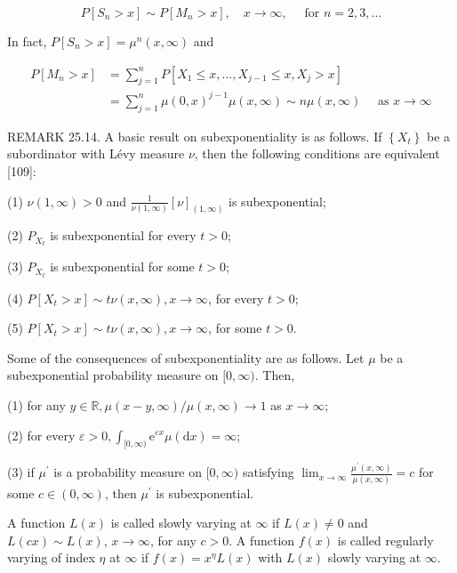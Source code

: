 \documentclass[a4paper,12pt]{article}
\begin{document}
$$
    P\left[S_{n}>x\right] \sim P\left[M_{n}>x\right], \quad x \rightarrow \infty, \quad \text { for } n=2,3, \ldots
$$

In fact, $P\left[S_{n}>x\right]=\mu^{n}(x, \infty)$ and

$$
    \begin{aligned}
        P\left[M_{n}>x\right] & =\sum_{j=1}^{n} P\left[X_{1} \leq x, \ldots, X_{j-1} \leq x, X_{j}>x\right]                                  \\
                              & =\sum_{j=1}^{n} \mu(0, x)^{j-1} \mu(x, \infty) \sim n \mu(x, \infty) \quad \text { as } x \rightarrow \infty
    \end{aligned}
$$

REMARK 25.14. A basic result on subexponentiality is as follows. If $\left\{X_{t}\right\}$ be a subordinator with Lévy measure $\nu$, then the following conditions are equivalent [109]:

(1) $\nu(1, \infty)>0$ and $\frac{1}{\nu(1, \infty)}[\nu]_{(1, \infty)}$ is subexponential;

(2) $P_{X_{t}}$ is subexponential for every $t>0$;

(3) $P_{X_{t}}$ is subexponential for some $t>0$;

(4) $P\left[X_{t}>x\right] \sim t \nu(x, \infty), x \rightarrow \infty$, for every $t>0$;

(5) $P\left[X_{t}>x\right] \sim t \nu(x, \infty), x \rightarrow \infty$, for some $t>0$.

Some of the consequences of subexponentiality are as follows. Let $\mu$ be a subexponential probability measure on $[0, \infty)$. Then,

(1) for any $y \in \mathbb{R}, \mu(x-y, \infty) / \mu(x, \infty) \rightarrow 1$ as $x \rightarrow \infty$;

(2) for every $\varepsilon>0, \int_{[0, \infty)} \mathrm{e}^{\varepsilon x} \mu(\mathrm{d} x)=\infty$;

(3) if $\mu^{\prime}$ is a probability measure on $[0, \infty)$ satisfying $\lim _{x \rightarrow \infty} \frac{\mu^{\prime}(x, \infty)}{\mu(x, \infty)}=c$ for some $c \in(0, \infty)$, then $\mu^{\prime}$ is subexponential.

A function $L(x)$ is called slowly varying at $\infty$ if $L(x) \neq 0$ and $L(c x) \sim L(x)$, $x \rightarrow \infty$, for any $c>0$. A function $f(x)$ is called regularly varying of index $\eta$ at $\infty$ if $f(x)=x^{\eta} L(x)$ with $L(x)$ slowly varying at $\infty$.
\end{document}
